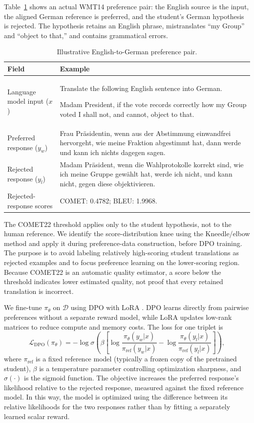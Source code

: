 \documentclass[conference]{IEEEtran}
\begin{document}
Table~\ref{tab:example_pair} shows an actual WMT14 preference pair: the English source is the input, the aligned German reference is preferred, and the student's German hypothesis is rejected. The hypothesis retains an English phrase, mistranslates ``my Group'' and ``object to that,'' and contains grammatical errors.

\begin{table}[t]
\centering
\caption{Illustrative English-to-German preference pair.}
\label{tab:example_pair}
\small
\begin{tabular}{|p{}|p{}|}
\hline
\textbf{Field} & \textbf{Example} \\
\hline
Language model input  ($x$)  & Translate the following English sentence into German. 

Madam President, if the vote records correctly how my Group voted I shall not, and cannot, object to that.\\
\hline
Preferred response ($y_w$) & Frau Präsidentin, wenn aus der Abstimmung einwandfrei hervorgeht, wie meine Fraktion abgestimmt hat, dann werde und kann ich nichts dagegen sagen. \\
\hline
Rejected response ($y_l$) & Madam Präsident, wenn die Wahlprotokolle korrekt sind, wie ich meine Gruppe gewählt hat, werde ich nicht, und kann nicht, gegen diese objektivieren. \\
\hline
Rejected-response scores & COMET: 0.4782; BLEU: 1.9968. \\
\hline
\end{tabular}
\end{table}

The COMET22 threshold applies only to the student hypothesis, not to the human reference. We identify the score-distribution knee using the Kneedle/elbow method \cite{b12} and apply it during preference-data construction, before DPO training. The purpose is to avoid labeling relatively high-scoring student translations as rejected examples and to focus preference learning on the lower-scoring region. Because COMET22 is an automatic quality estimator, a score below the threshold indicates lower estimated quality, not proof that every retained translation is incorrect.

We fine-tune $\pi_\theta$ on $\mathcal{D}$ using DPO with LoRA \cite{b11}. DPO learns directly from pairwise preferences without a separate reward model, while LoRA updates low-rank matrices to reduce compute and memory costs. The loss for one triplet is
\[
\mathcal{L}_{\text{DPO}}(\pi_\theta) =
- \log \sigma \left(
\beta \left[
\log \frac{\pi_\theta(y_w|x)}{\pi_{\text{ref}}(y_w|x)}
-
\log \frac{\pi_\theta(y_l|x)}{\pi_{\text{ref}}(y_l|x)}
\right]
\right),
\]
where $\pi_{\text{ref}}$ is a fixed reference model (typically a frozen copy of the pretrained student), $\beta$ is a temperature parameter controlling optimization sharpness, and $\sigma(\cdot)$ is the sigmoid function. The objective increases the preferred response's likelihood relative to the rejected response, measured against the fixed reference model. In this way, the model is optimized using the difference between its relative likelihoods for the two responses rather than by fitting a separately learned scalar reward.
\end{document}
